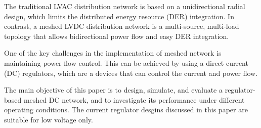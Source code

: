 The traditional LVAC distribution network is based on a unidirectional radial design, which limits the distributed energy resource (DER) integration. In contrast, a meshed LVDC distribution network is a multi-source, multi-load topology that allows bidirectional power flow and easy DER integration.

One of the key challenges in the implementation of meshed network is maintaining power flow control. This can be achieved by using a direct current (DC) regulators, which are a devices that can control the current and power flow.

The main objective of this paper is to design, simulate, and evaluate a regulator-based meshed DC network, and to investigate its performance under different operating conditions. The current regulator desgins discussed in this paper are suitable for low voltage only.










